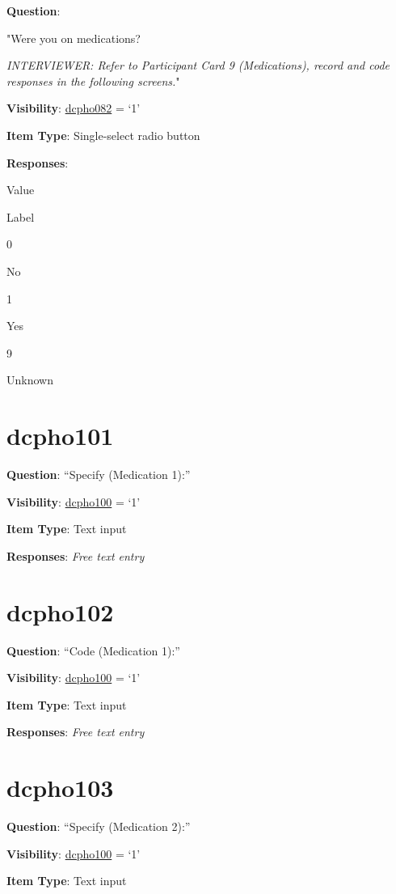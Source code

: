 \documentclass[]{book}
\begin{document}
\textbf{Question}:

"Were you on medications?

\emph{INTERVIEWER: Refer to Participant Card 9 (Medications), record and code responses in the following screens.}"

\textbf{Visibility}: \protect\hyperlink{dcpho082}{dcpho082} = `1'

\textbf{Item Type}: Single-select radio button

\textbf{Responses}:

Value

Label

0

No

1

Yes

9

Unknown

\hypertarget{dcpho101}{%
\section{dcpho101}\label{dcpho101}}

\textbf{Question}: ``Specify (Medication 1):''

\textbf{Visibility}: \protect\hyperlink{dcpho100}{dcpho100} = `1'

\textbf{Item Type}: Text input

\textbf{Responses}: \emph{Free text entry}

\hypertarget{dcpho102}{%
\section{dcpho102}\label{dcpho102}}

\textbf{Question}: ``Code (Medication 1):''

\textbf{Visibility}: \protect\hyperlink{dcpho100}{dcpho100} = `1'

\textbf{Item Type}: Text input

\textbf{Responses}: \emph{Free text entry}

\hypertarget{dcpho103}{%
\section{dcpho103}\label{dcpho103}}

\textbf{Question}: ``Specify (Medication 2):''

\textbf{Visibility}: \protect\hyperlink{dcpho100}{dcpho100} = `1'

\textbf{Item Type}: Text input
\end{document}
